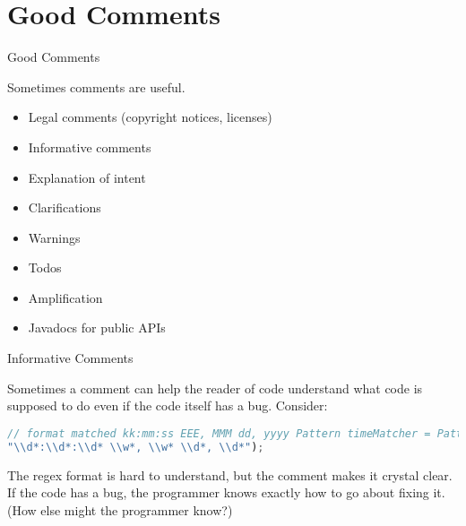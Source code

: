 \documentclass{beamer}
\begin{document}
\section{Good Comments}

\begin{frame}[fragile]{Good Comments}


Sometimes comments are useful.
\begin{itemize}
\item Legal comments (copyright notices, licenses)
\item Informative comments
\item Explanation of intent
\item Clarifications
\item Warnings
\item Todos
\item Amplification
\item Javadocs for public APIs
\end{itemize}

\end{frame}

\begin{frame}[fragile]{Informative Comments}


Sometimes a comment can help the reader of code understand what code is supposed to do even if the code itself has a bug.  Consider:
\begin{lstlisting}[language=Java]
// format matched kk:mm:ss EEE, MMM dd, yyyy Pattern timeMatcher = Pattern.compile(
"\\d*:\\d*:\\d* \\w*, \\w* \\d*, \\d*");
\end{lstlisting}
The regex format is hard to understand, but the comment makes it crystal clear.  If the code has a bug, the programmer knows exactly how to go about fixing it.  (How else might the programmer know?)


\end{frame}
\end{document}

